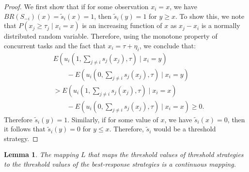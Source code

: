 \documentclass{nature}
\newtheorem{lemma}{Lemma}
\begin{document}
\begin{proof}
We first show that if for some observation $x_i=x$, we have $BR(S_{-i})(x)=\tilde{s}_i(x)=1$, then $\tilde{s}_i(y)=1$ for $y\geq x$. To show this,  we note that $P(x_j\geq \tau_j\mid x_i=x)$ is an increasing function of $x$ as $x_j-x_i$ is a normally distributed random variable. Therefore, using the monotone property of concurrent tasks and the fact that $x_i=\tau+\eta_i$, we conclude that:
\vspace{-5px}
\begin{align*}
&E(u_i(1,\sum_{j\not=i}s_j(x_j),\tau)\mid x_i=y)\\ 
&\qquad-E(u_i(0,\sum_{j\not=i}s_j(x_j),\tau)\mid x_i=y)\\ 
&>E(u_i(1,\sum_{j\not=i}s_j(x_j),\tau)\mid x_i=x)\\
&\qquad-E(u_i(0,\sum_{j\not=i}s_j(x_j),\tau)\mid x_i=x)\geq 0.
\end{align*}
Therefore $\tilde{s}_i(y)=1$. Similarly, if for some value of $x$, we have $\tilde{s}_i(x)=0$, then it follows that $\tilde{s}_i(y)=0$ for $y\leq x$. Therefore, $\tilde{s}_i$ would be a threshold strategy.  
\end{proof}


\begin{lemma}
The mapping $L$ that maps the threshold values of threshold strategies to the threshold values of the best-response strategies is a continuous mapping. 
\end{lemma}
\end{document}
